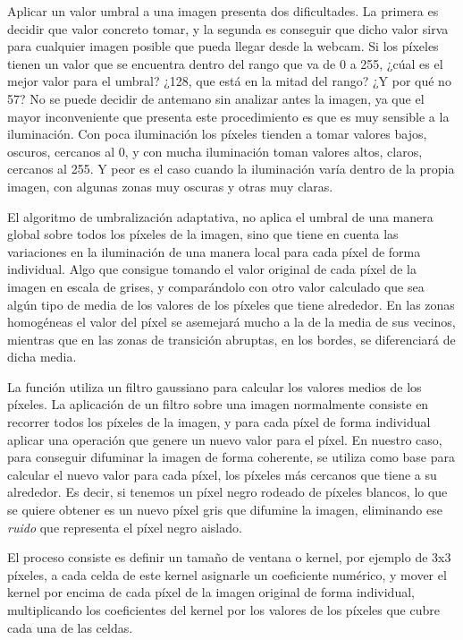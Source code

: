 Aplicar un valor umbral a una imagen presenta dos dificultades. La primera es decidir que valor concreto tomar, y la segunda es conseguir que dicho valor sirva para cualquier imagen posible que pueda llegar desde la webcam. Si los píxeles tienen un valor que se encuentra dentro del rango que va de 0 a 255, ¿cúal es el mejor valor para el umbral? ¿128, que está en la mitad del rango? ¿Y por qué no 57? No se puede decidir de antemano sin analizar antes la imagen, ya que el mayor inconveniente que presenta este procedimiento es que es muy sensible a la iluminación. Con poca iluminación los píxeles tienden a tomar valores bajos, oscuros, cercanos al 0, y con mucha iluminación toman valores altos, claros, cercanos al 255. Y peor es el caso cuando la iluminación varía dentro de la propia imagen, con algunas zonas muy oscuras y otras muy claras.

El algoritmo de umbralización adaptativa, no aplica el umbral de una manera global sobre todos los píxeles de la imagen, sino que tiene en cuenta las variaciones en la iluminación de una manera local para cada píxel de forma individual. Algo que consigue tomando el valor original de cada píxel de la imagen en escala de grises, y comparándolo con otro valor calculado que sea algún tipo de media de los valores de los píxeles que tiene alrededor. En las zonas homogéneas el valor del píxel se asemejará mucho a la de la media de sus vecinos, mientras que en las zonas de transición abruptas, en los bordes, se diferenciará de dicha media.

La función utiliza un filtro gaussiano para calcular los valores medios de los píxeles. La aplicación de un filtro sobre una imagen normalmente consiste en recorrer todos los píxeles de la imagen, y para cada píxel de forma individual aplicar una operación que genere un nuevo valor para el píxel. En nuestro caso, para conseguir difuminar la imagen de forma coherente, se utiliza como base para calcular el nuevo valor para cada píxel, los píxeles más cercanos que tiene a su alrededor. Es decir, si tenemos un píxel negro rodeado de píxeles blancos, lo que se quiere obtener es un nuevo píxel gris que difumine la imagen, eliminando ese \textit{ruido} que representa el píxel negro aislado.

El proceso consiste es definir un tamaño de ventana o kernel, por ejemplo de 3x3 píxeles, a cada celda de este kernel asignarle un coeficiente numérico, y mover el kernel por encima de cada píxel de la imagen original de forma individual, multiplicando los coeficientes del kernel por los valores de los píxeles que cubre cada una de las celdas.


